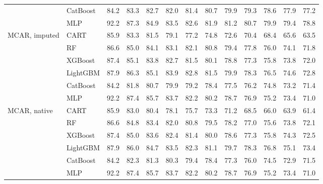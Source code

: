 \begin{table}[p]
\begin{tabular}{@{}llrrrrrrrrrrr@{}}
 & CatBoost & 84.2 & 83.3 & 82.7 & 82.0 & 81.4 & 80.7 & 79.9 & 79.3 & 78.6 & 77.9 & 77.2 \\
 & MLP & 92.2 & 87.3 & 84.9 & 83.5 & 82.6 & 81.9 & 81.2 & 80.7 & 79.9 & 79.4 & 78.8 \\
\midrule
MCAR, imputed & CART & 85.9 & 83.3 & 81.5 & 79.1 & 77.2 & 74.8 & 72.6 & 70.4 & 68.4 & 65.6 & 63.5 \\
 & RF & 86.6 & 85.0 & 84.1 & 83.1 & 82.1 & 80.8 & 79.4 & 77.8 & 76.0 & 74.1 & 71.8 \\
 & XGBoost & 87.4 & 85.1 & 83.8 & 82.7 & 81.5 & 80.1 & 78.8 & 77.3 & 75.8 & 73.8 & 72.0 \\
 & LightGBM & 87.9 & 86.3 & 85.1 & 83.9 & 82.8 & 81.5 & 79.9 & 78.3 & 76.5 & 74.6 & 72.8 \\
 & CatBoost & 84.2 & 81.8 & 80.7 & 79.9 & 79.2 & 78.4 & 77.5 & 76.2 & 74.8 & 73.2 & 71.4 \\
 & MLP & 92.2 & 87.4 & 85.7 & 83.7 & 82.2 & 80.2 & 78.7 & 76.9 & 75.2 & 73.4 & 71.0 \\
\midrule
MCAR, native & CART & 85.9 & 83.0 & 80.4 & 78.1 & 75.7 & 73.3 & 71.2 & 68.5 & 66.0 & 63.9 & 61.4 \\
 & RF & 86.6 & 84.8 & 83.4 & 82.0 & 80.8 & 79.5 & 78.2 & 77.0 & 75.6 & 73.8 & 72.1 \\
 & XGBoost & 87.4 & 85.0 & 83.6 & 82.4 & 81.4 & 80.0 & 78.6 & 77.3 & 75.8 & 74.3 & 72.5 \\
 & LightGBM & 87.9 & 86.0 & 84.7 & 83.5 & 82.3 & 81.1 & 79.7 & 78.3 & 76.8 & 75.1 & 73.4 \\
 & CatBoost & 84.2 & 82.3 & 81.3 & 80.3 & 79.4 & 78.4 & 77.3 & 76.0 & 74.5 & 72.9 & 71.5 \\
 & MLP & 92.2 & 87.4 & 85.7 & 83.7 & 82.2 & 80.2 & 78.7 & 76.9 & 75.2 & 73.4 & 71.0 \\
\bottomrule
\end{tabular}
\end{table}

